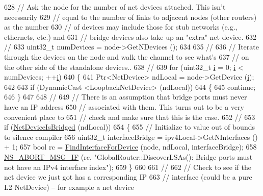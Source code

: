 \begin{DoxyCode}
628   \textcolor{comment}{// Ask the node for the number of net devices attached. This isn't necessarily }
629   \textcolor{comment}{// equal to the number of links to adjacent nodes (other routers) as the number}
630   \textcolor{comment}{// of devices may include those for stub networks (e.g., ethernets, etc.) and }
631   \textcolor{comment}{// bridge devices also take up an "extra" net device.}
632   \textcolor{comment}{//}
633   uint32\_t numDevices = node->GetNDevices ();
634 
635   \textcolor{comment}{//}
636   \textcolor{comment}{// Iterate through the devices on the node and walk the channel to see what's}
637   \textcolor{comment}{// on the other side of the standalone devices..}
638   \textcolor{comment}{//}
639   \textcolor{keywordflow}{for} (uint32\_t \hyperlink{bernuolliDistribution_8m_a6f6ccfcf58b31cb6412107d9d5281426}{i} = 0; \hyperlink{bernuolliDistribution_8m_a6f6ccfcf58b31cb6412107d9d5281426}{i} < numDevices; ++\hyperlink{bernuolliDistribution_8m_a6f6ccfcf58b31cb6412107d9d5281426}{i})
640     \{
641       Ptr<NetDevice> ndLocal = node->GetDevice (\hyperlink{bernuolliDistribution_8m_a6f6ccfcf58b31cb6412107d9d5281426}{i});
642 
643       \textcolor{keywordflow}{if} (DynamicCast <LoopbackNetDevice> (ndLocal))
644         \{
645           \textcolor{keywordflow}{continue};
646         \}
647 
648       \textcolor{comment}{//}
649       \textcolor{comment}{// There is an assumption that bridge ports must never have an IP address }
650       \textcolor{comment}{// associated with them.  This turns out to be a very convenient place to}
651       \textcolor{comment}{// check and make sure that this is the case.}
652       \textcolor{comment}{//}
653       \textcolor{keywordflow}{if} (\hyperlink{classns3_1_1GlobalRouter_ad330b65439cd1be39799b52df948f98b}{NetDeviceIsBridged} (ndLocal))
654         \{
655           \textcolor{comment}{// Initialize to value out of bounds to silence compiler}
656           uint32\_t interfaceBridge = ipv4Local->GetNInterfaces () + 1;
657           \textcolor{keywordtype}{bool} rc = \hyperlink{classns3_1_1GlobalRouter_a7b30c3c09f93e3f3ac7cfe787b51d127}{FindInterfaceForDevice} (node, ndLocal, interfaceBridge);
658           \hyperlink{group__fatal_ga6653324225bc139e46deea177614ceee}{NS\_ABORT\_MSG\_IF} (rc, \textcolor{stringliteral}{"GlobalRouter::DiscoverLSAs(): Bridge ports must not have an
       IPv4 interface index"});
659         \}
660 
661       \textcolor{comment}{//}
662       \textcolor{comment}{// Check to see if the net device we just got has a corresponding IP }
663       \textcolor{comment}{// interface (could be a pure L2 NetDevice) -- for example a net device}

\end{DoxyCode}
